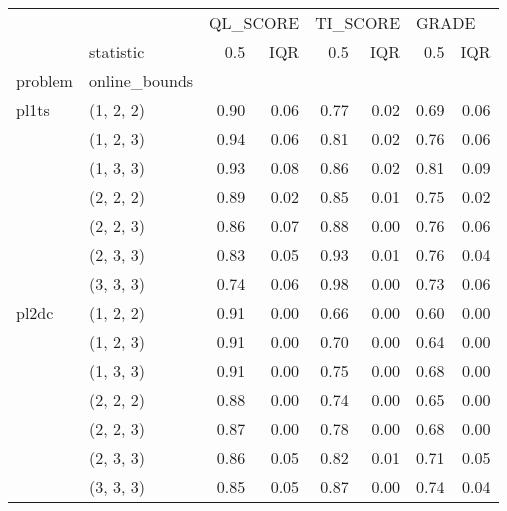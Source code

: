 \begin{tabular}{llrrrrrr}
\toprule
      & {} & \multicolumn{2}{l}{QL\_SCORE} & \multicolumn{2}{l}{TI\_SCORE} & \multicolumn{2}{l}{GRADE} \\
      & statistic &      0.5 &  IQR &      0.5 &  IQR &   0.5 &  IQR \\
problem & online\_bounds &          &      &          &      &       &      \\
\midrule
pl1ts & (1, 2, 2) &     0.90 & 0.06 &     0.77 & 0.02 &  0.69 & 0.06 \\
      & (1, 2, 3) &     0.94 & 0.06 &     0.81 & 0.02 &  0.76 & 0.06 \\
      & (1, 3, 3) &     0.93 & 0.08 &     0.86 & 0.02 &  0.81 & 0.09 \\
      & (2, 2, 2) &     0.89 & 0.02 &     0.85 & 0.01 &  0.75 & 0.02 \\
      & (2, 2, 3) &     0.86 & 0.07 &     0.88 & 0.00 &  0.76 & 0.06 \\
      & (2, 3, 3) &     0.83 & 0.05 &     0.93 & 0.01 &  0.76 & 0.04 \\
      & (3, 3, 3) &     0.74 & 0.06 &     0.98 & 0.00 &  0.73 & 0.06 \\
pl2dc & (1, 2, 2) &     0.91 & 0.00 &     0.66 & 0.00 &  0.60 & 0.00 \\
      & (1, 2, 3) &     0.91 & 0.00 &     0.70 & 0.00 &  0.64 & 0.00 \\
      & (1, 3, 3) &     0.91 & 0.00 &     0.75 & 0.00 &  0.68 & 0.00 \\
      & (2, 2, 2) &     0.88 & 0.00 &     0.74 & 0.00 &  0.65 & 0.00 \\
      & (2, 2, 3) &     0.87 & 0.00 &     0.78 & 0.00 &  0.68 & 0.00 \\
      & (2, 3, 3) &     0.86 & 0.05 &     0.82 & 0.01 &  0.71 & 0.05 \\
      & (3, 3, 3) &     0.85 & 0.05 &     0.87 & 0.00 &  0.74 & 0.04 \\
\bottomrule
\end{tabular}
